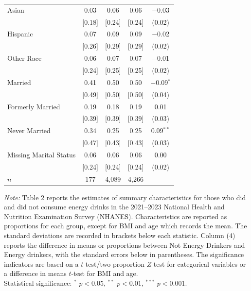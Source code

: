 \begin{table}[htbp]
\begin{tabular}{lcccc}
Asian                 & 0.03 & 0.06 & 0.06 & $-$0.03 \\
                      & [0.18] & [0.24] & [0.24] & (0.02) \\
Hispanic              & 0.07 & 0.09 & 0.09 & $-$0.02 \\
                      & [0.26] & [0.29] & [0.29] & (0.02) \\
Other Race            & 0.06 & 0.07 & 0.07 & $-$0.01 \\
                      & [0.24] & [0.25] & [0.25] & (0.02) \\
Married               & 0.41 & 0.50 & 0.50 & $-$0.09$^{*}$ \\
                      & [0.49] & [0.50] & [0.50] & (0.04) \\
Formerly Married      & 0.19 & 0.18 & 0.19 & 0.01 \\
                      & [0.39] & [0.39] & [0.39] & (0.03) \\
Never Married         & 0.34 & 0.25 & 0.25 & 0.09$^{**}$ \\
                      & [0.47] & [0.43] & [0.43] & (0.03) \\
Missing Marital Status & 0.06 & 0.06 & 0.06 & 0.00 \\
                      & [0.24] & [0.24] & [0.24] & (0.02) \\
\midrule
$n$ & 177 & 4,089 & 4,266 & \\
\bottomrule
\end{tabular}

\smallskip
\footnotesize\textit{Note:} Table 2 reports the estimates of summary characteristics for those who did and did not consume energy drinks in the 2021--2023 National Health and Nutrition Examination Survey (NHANES). Characteristics are reported as proportions for each group, except for BMI and age which records the mean. The standard deviations are recorded in brackets below each statistic. Column (4) reports the difference in means or proportions between Not Energy Drinkers and Energy drinkers, with the standard errors below in parentheses. The significance indicators are based on a $t$-test/two-proportion $Z$-test for categorical variables or a difference in means $t$-test for BMI and age. \\
Statistical significance: $^{*}$ $p < 0.05$, $^{**}$ $p < 0.01$, $^{***}$ $p < 0.001$.
\end{table}

